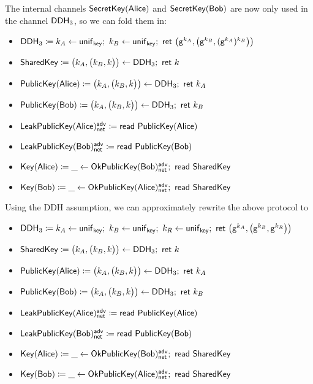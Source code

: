 \noindent The internal channels $\mathsf{SecretKey}(\mathsf{Alice})$ and $\mathsf{SecretKey}(\mathsf{Bob})$ are now only used in the channel $\mathsf{DDH}_3$, so we can fold them in:

\begin{itemize}
\item {\color{red} $\mathsf{DDH}_3 \coloneqq k_A \leftarrow \mathsf{unif}_{\mathsf{key}}; \ k_B \leftarrow \mathsf{unif}_{\mathsf{key}}; \ \mathsf{ret} \ \big(\mathsf{g}^{k_A}, \big(\mathsf{g}^{k_B}, (\mathsf{g}^{k_A})^{k_B}\big)\big)$}
\item $\SharedKey \coloneqq \big(k_A,\big(k_B,k\big)\big) \leftarrow \DDH_3; \ \ret{k}$
\item $\PublicKey(\Alice) \coloneqq \big(k_A,\big(k_B,k\big)\big) \leftarrow \DDH_3; \ \ret{k_A}$
\item $\PublicKey(\Bob) \coloneqq \big(k_A,\big(k_B,k\big)\big) \leftarrow \DDH_3; \ \ret{k_B}$
\item $\mathsf{LeakPublicKey}(\mathsf{Alice})^{\mathsf{adv}}_{\mathsf{net}} \coloneqq \mathsf{read} \ \mathsf{PublicKey}(\mathsf{Alice})$
\item $\mathsf{LeakPublicKey}(\mathsf{Bob})^{\mathsf{adv}}_{\mathsf{net}} \coloneqq \mathsf{read} \ \mathsf{PublicKey}(\mathsf{Bob})$
\item $\mathsf{Key}(\mathsf{Alice}) \coloneqq \_ \leftarrow \mathsf{OkPublicKey}(\mathsf{Bob})^{\mathsf{adv}}_{\mathsf{net}}; \ \mathsf{read} \ \mathsf{SharedKey}$
\item $\mathsf{Key}(\mathsf{Bob}) \coloneqq \_ \leftarrow \mathsf{OkPublicKey}(\mathsf{Alice})^{\mathsf{adv}}_{\mathsf{net}}; \ \mathsf{read} \ \mathsf{SharedKey}$
\end{itemize}

\noindent Using the DDH assumption, we can approximately rewrite the above protocol to

\begin{itemize}
\item {\color{red} $\DDH_3 \coloneqq k_A \leftarrow \unif_\key; \ k_B \leftarrow \unif_\key; \ k_R \leftarrow \unif_\key; \ \ret{\big(\gen^{k_A}, \big(\gen^{k_B}, \gen^{k_R}\big)\big)}$}
\item $\SharedKey \coloneqq \big(k_A,\big(k_B,k\big)\big) \leftarrow \DDH_3; \ \ret{k}$
\item $\PublicKey(\Alice) \coloneqq \big(k_A,\big(k_B,k\big)\big) \leftarrow \DDH_3; \ \ret{k_A}$
\item $\PublicKey(\Bob) \coloneqq \big(k_A,\big(k_B,k\big)\big) \leftarrow \DDH_3; \ \ret{k_B}$
\item $\mathsf{LeakPublicKey}(\mathsf{Alice})^{\mathsf{adv}}_{\mathsf{net}} \coloneqq \mathsf{read} \ \mathsf{PublicKey}(\mathsf{Alice})$
\item $\mathsf{LeakPublicKey}(\mathsf{Bob})^{\mathsf{adv}}_{\mathsf{net}} \coloneqq \mathsf{read} \ \mathsf{PublicKey}(\mathsf{Bob})$
\item $\mathsf{Key}(\mathsf{Alice}) \coloneqq \_ \leftarrow \mathsf{OkPublicKey}(\mathsf{Bob})^{\mathsf{adv}}_{\mathsf{net}}; \ \mathsf{read} \ \mathsf{SharedKey}$
\item $\mathsf{Key}(\mathsf{Bob}) \coloneqq \_ \leftarrow \mathsf{OkPublicKey}(\mathsf{Alice})^{\mathsf{adv}}_{\mathsf{net}}; \ \mathsf{read} \ \mathsf{SharedKey}$
\end{itemize}

